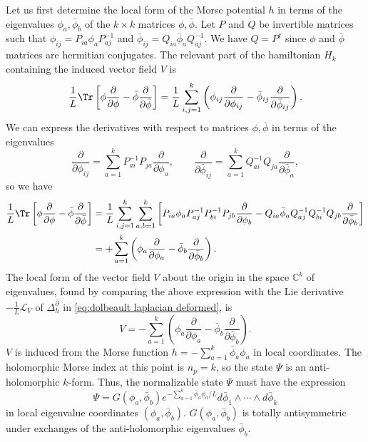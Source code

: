\documentclass[a4paper,12pt]{article}
\begin{document}
Let us first determine the local form of the Morse potential $h$ in terms of the eigenvalues $\phi_a, \bar\phi_b$ of the $k \times k$ matrices $\phi, \bar\phi$. Let $P$ and $Q$ be invertible matrices such that $\phi_{ij} = P_{ia} \phi_a P^{-1}_{aj}$ and $\bar\phi_{ij} = Q_{ia} \bar\phi_a Q^{-1}_{aj}$. We have $Q = P^\dag$ since $\phi$ and $\bar\phi$ matrices are hermitian conjugates. The relevant part of the hamiltonian $H_k$ containing the induced vector field $V$ is
\begin{equation}
\frac{1}{L} \Tr \left[ \phi \frac{\partial}{\partial \phi} - \bar\phi \frac{\partial}{\partial \bar\phi} \right] = \frac{1}{L} \sum_{i,j=1}^{k} \left( \phi_{ij} \frac{\partial}{\partial \phi_{ij}} - \bar\phi_{ij} \frac{\partial}{\partial \bar\phi_{ij}} \right).
\end{equation}
We can express the derivatives with respect to matrices $\phi, \bar\phi$ in terms of the eigenvalues
\begin{equation}
\frac{\partial}{\partial \phi_{ij}} = \sum_{a=1}^k P^{-1}_{ai} P_{ja} \frac{\partial}{\partial \phi_a}, \qquad \frac{\partial}{\partial \bar\phi_{ij}} = \sum_{a=1}^k Q^{-1}_{ai} Q_{ja} \frac{\partial}{\partial \bar\phi_a},
\end{equation}
so we have
\begin{align}
    \frac{1}{L} \Tr \left[ \phi \frac{\partial}{\partial \phi} - \bar\phi \frac{\partial}{\partial \bar\phi} \right] &= \frac{1}{L} \sum_{i,j=1}^{k} \sum_{a,b=1}^{k} \left[ P_{ia} \phi_a P^{-1}_{aj} P^{-1}_{bi} P_{jb} \frac{\partial}{\partial \phi_b} - Q_{ia} \bar\phi_a Q^{-1}_{aj} Q^{-1}_{bi} Q_{jb} \frac{\partial}{\partial \bar\phi_b} \right] \nonumber \\
    &= + \sum_{a=1}^k \left( \phi_a \frac{\partial}{\partial \phi_a} - \bar\phi_b \frac{\partial}{\partial \bar\phi_b} \right).
\end{align}
The local form of the vector field $V$ about the origin in the space $\mathbb{C}^k$ of eigenvalues, found by comparing the above expression with the Lie derivative $-\frac{1}{L}\mathcal{L}_V$ of $\Delta_h^{\bar\partial}$ in \eqref{eq:dolbeault laplacian deformed}, is
\begin{equation}
V = - \sum_{a = 1}^k \left( \phi_a \frac{\partial}{\partial \phi_a} - \bar\phi_b \frac{\partial}{\partial \bar\phi_b} \right).
\end{equation}
$V$ is induced from the Morse function $h = - \sum_{a=1}^k \bar\phi_a \phi_a$ in local coordinates. The holomorphic Morse index at this point is $n_p = k$, so the state $\Psi$ is an anti-holomorphic $k$-form. Thus, the normalizable state $\Psi$ must have the expression
\begin{equation}
\Psi = G(\phi_a, \bar\phi_b) e^{-\sum_{a=1}^k \bar\phi_a \phi_a / L} d\bar\phi_1 \wedge \cdots \wedge d\bar\phi_k
\end{equation}
in local eigenvalue coordinates $(\phi_a, \bar\phi_b)$. $G(\phi_a, \bar\phi_b)$ is totally antisymmetric under exchanges of the anti-holomorphic eigenvalues $\bar\phi_b$.
\end{document}
